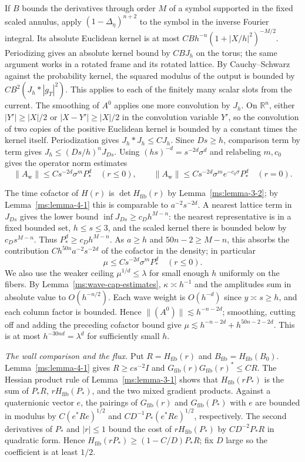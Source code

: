 If $B$ bounds the derivatives through order $M$ of a symbol supported in the fixed scaled annulus, apply $(1-\Delta_\eta)^{n+2}$ to the symbol in the inverse Fourier integral. Its absolute Euclidean kernel is at most $CBh^{-n}(1+|X/h|^2)^{-M/2}$. Periodizing gives an absolute kernel bound by $CBJ_h$ on the torus; the same argument works in a rotated frame and its rotated lattice. By Cauchy--Schwarz against the probability kernel, the squared modulus of the output is bounded by $CB^2(J_h*|g_T|^2)$. This applies to each of the finitely many scalar slots from the current. The smoothing of $A^0$ applies one more convolution by $J_h$. On $\mathbb R^n$, either $|Y'|\ge |X|/2$ or $|X-Y'|\ge |X|/2$ in the convolution variable $Y'$, so the convolution of two copies of the positive Euclidean kernel is bounded by a constant times the kernel itself. Periodization gives $J_h*J_h\le CJ_h$. Since $Ds\ge h$, comparison term by term gives $J_h\le(Ds/h)^nJ_{Ds}$. Using $(hs)^{-d}=s^{-2d}\sigma^d$ and relabeling $m,c_0$ gives the operator norm estimates
\[
\|A_{\mathrm w}\|\le Cs^{-2d}\sigma^mP_*^d\quad(r\le0),\qquad
\|A_{\mathrm w}\|\le Cs^{-2d}\sigma^m e^{-c_0\sigma}P_*^d\quad(r=0).
\]

The time cofactor of $H(r)$ is $\det H_{\mathrm{fib}}(r)$ by Lemma~\ref{ms:lemma-3-2}; by Lemma~\ref{ms:lemma-4-1} this is comparable to $a^{-2}s^{-2d}$. A nearest lattice term in $J_{Ds}$ gives the lower bound $\inf J_{Ds}\ge c_D h^{M-n}$: the nearest representative is in a fixed bounded set, $h\le s\le3$, and the scaled kernel there is bounded below by $c_Ds^{M-n}$. Thus $P_*^d\ge c_Dh^{M-n}$. As $a\ge h$ and $50n-2\ge M-n$, this absorbs the contribution $Ch^{50n}a^{-2}s^{-2d}$ of the cofactor in the density; in particular
\[
\mu\le Cs^{-2d}\sigma^mP_*^d\quad(r\le0).
\]
We also use the weaker ceiling $\mu^{1/d}\le\lambda$ for small enough $h$ uniformly on the fibers. By Lemma~\ref{ms:wave-cap-estimates}, $\kappa\asymp h^{-1}$ and the amplitudes sum in absolute value to $O(h^{-n/2})$. Each wave weight is $O(h^{-d})$ since $y\asymp s\ge h$, and each column factor is bounded. Hence $\|(A^0)\|\lesssim h^{-n-2d}$; smoothing, cutting off and adding the preceding cofactor bound give $\mu\lesssim h^{-n-2d}+h^{50n-2-2d}$. This is at most $h^{-30nd}=\lambda^d$ for sufficiently small $h$.

\smallskip
\noindent\textit{The wall comparison and the flux.}
Put $R=H_{\mathrm{fib}}(r)$ and $B_{\mathrm{fib}}=H_{\mathrm{fib}}(B_0)$. Lemma~\ref{ms:lemma-4-1} gives $R\ge cs^{-2}I$ and $G_{\mathrm{fib}}(r)G_{\mathrm{fib}}(r)^*\le CR$. The Hessian product rule of Lemma~\ref{ms:lemma-3-1} shows that $H_{\mathrm{fib}}(rP_*)$ is the sum of $P_*R$, $rH_{\mathrm{fib}}(P_*)$, and the two mixed gradient products. Against a quaternionic vector $e$, the pairings of $G_{\mathrm{fib}}(r)$ and $G_{\mathrm{fib}}(P_*)$ with $e$ are bounded in modulus by $C(e^*Re)^{1/2}$ and $CD^{-1}P_*(e^*Re)^{1/2}$, respectively. The second derivatives of $P_*$ and $|r|\le1$ bound the cost of $rH_{\mathrm{fib}}(P_*)$ by $CD^{-2}P_*R$ in quadratic form. Hence $H_{\mathrm{fib}}(rP_*)\ge(1-C/D)P_*R$; fix $D$ large so the coefficient is at least $1/2$.

